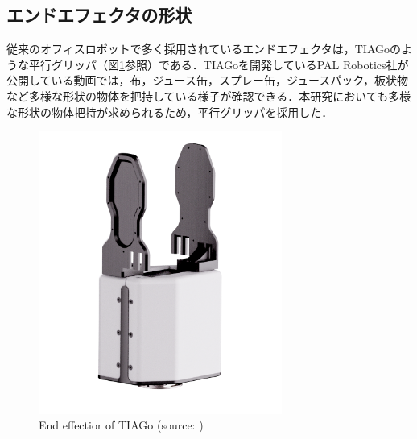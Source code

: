 \subsection{エンドエフェクタの形状}
従来のオフィスロボットで多く採用されているエンドエフェクタは，TIAGoのような平行グリッパ（図\ref{fig:tiago_hand}参照）である．TIAGoを開発しているPAL Robotics社が公開している動画\cite{TIAGo-movie:online}では，布，ジュース缶，スプレー缶，ジュースパック，板状物など多様な形状の物体を把持している様子が確認できる．本研究においても多様な形状の物体把持が求められるため，平行グリッパを採用した．
\begin{figure}[h]
  \centering
  \includegraphics[width=8cm]{images/2syou/tiago_hand.png}
  \caption[End effectior of TIAGo]{End effectior of TIAGo (source: \cite{TIAGo:online})}
  \label{fig:tiago_hand}
\end{figure}
\clearpage
\newpage